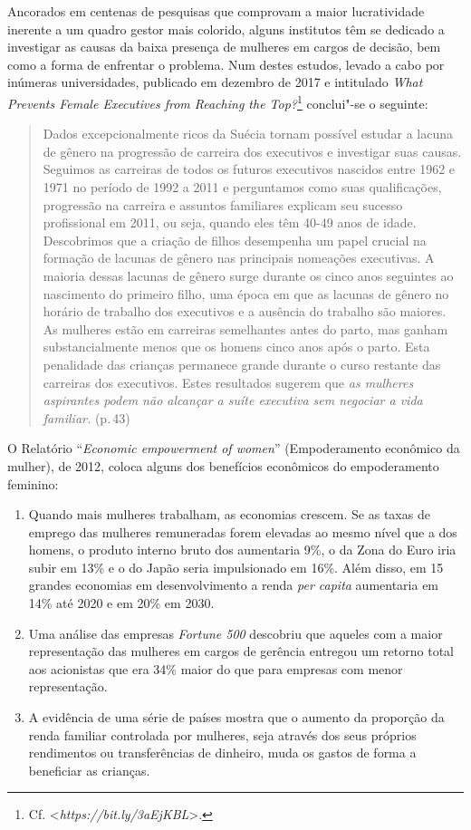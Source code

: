 Ancorados em centenas de pesquisas que comprovam a maior lucratividade
inerente a um quadro gestor mais colorido, alguns institutos têm se
dedicado a investigar as causas da baixa presença de mulheres em cargos
de decisão, bem como a forma de enfrentar o problema. Num destes
estudos, levado a cabo por inúmeras universidades, publicado em dezembro
de 2017 e intitulado \emph{What Prevents Female Executives from Reaching
the Top?}\footnote{Cf. \textless{}\emph{https://bit.ly/3aEjKBL}\textgreater{}.}
conclui"-se o seguinte:

\begin{quote}
Dados excepcionalmente ricos da Suécia tornam possível estudar a lacuna
de gênero na progressão de carreira dos executivos e investigar suas
causas. Seguimos as carreiras de todos os futuros executivos nascidos
entre 1962 e 1971 no período de 1992 a 2011 e perguntamos como suas
qualificações, progressão na carreira e assuntos familiares explicam seu
sucesso profissional em 2011, ou seja, quando eles têm 40-49 anos de
idade. Descobrimos que a criação de filhos desempenha um papel crucial
na formação de lacunas de gênero nas principais nomeações executivas. A
maioria dessas lacunas de gênero surge durante os cinco anos seguintes
ao nascimento do primeiro filho, uma época em que as lacunas de gênero
no horário de trabalho dos executivos e a ausência do trabalho são
maiores. As mulheres estão em carreiras semelhantes antes do parto, mas
ganham substancialmente menos que os homens cinco anos após o parto.
Esta penalidade das crianças permanece grande durante o curso restante
das carreiras dos executivos. Estes resultados sugerem que \emph{as
mulheres aspirantes podem não alcançar a suíte executiva sem negociar a
vida familiar.} (p.\,43)
\end{quote}

O Relatório ``\emph{Economic empowerment of women}'' (Empoderamento
econômico da mulher), de 2012, coloca alguns dos benefícios econômicos
do empoderamento feminino:

\begin{enumerate}
\def\labelenumi{\alph{enumi}.}

\item Quando mais mulheres trabalham, as economias crescem. Se as taxas de
emprego das mulheres remuneradas forem elevadas ao mesmo nível que a dos
homens, o produto interno bruto dos  aumentaria 9\%, o da Zona do
Euro iria subir em 13\% e o do Japão seria impulsionado em 16\%. Além
disso, em 15 grandes economias em desenvolvimento a renda \emph{per
capita} aumentaria em 14\% até 2020 e em 20\% em 2030.

\item Uma análise das empresas \emph{Fortune 500} descobriu que aqueles com
a maior representação das mulheres em cargos de gerência entregou um
retorno total aos acionistas que era 34\% maior do que para empresas com
menor representação.

\item A evidência de uma série de países mostra que o aumento da proporção
da renda familiar controlada por mulheres, seja através dos seus
próprios rendimentos ou transferências de dinheiro, muda os gastos de
forma a beneficiar as crianças.
\end{enumerate}

